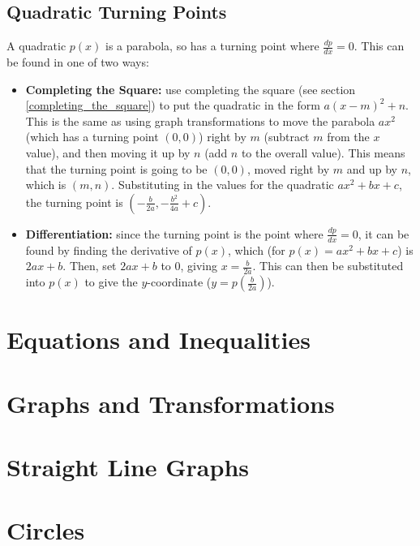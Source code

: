     \subsection{Quadratic Turning Points}
        A quadratic $p(x)$ is a parabola, so has a turning point where $\frac{dp}{dx}=0$.
        This can be found in one of two ways:
        \begin{itemize}
            \item \textbf{Completing the Square:} use completing the square (see section \ref{completing_the_square}) to put the quadratic in the form $a(x-m)^2+n$.
            This is the same as using graph transformations to move the parabola $ax^2$ (which has a turning point $(0,0)$) right by $m$ (subtract $m$ from the $x$ value), and then moving it up by $n$ (add $n$ to the overall value).
            This means that the turning point is going to be $(0,0)$, moved right by $m$ and up by $n$, which is $(m,n)$.
            Substituting in the values for the quadratic $ax^2+bx+c$, the turning point is $\left(-\frac{b}{2a},-\frac{b^2}{4a}+c\right)$.
            \item \textbf{Differentiation:} since the turning point is the point where $\frac{dp}{dx}=0$, it can be found by finding the derivative of $p(x)$, which (for $p(x)=ax^2+bx+c$) is $2ax+b$.
            Then, set $2ax+b$ to 0, giving $x=\frac{b}{2a}$.
            This can then be substituted into $p(x)$ to give the $y$-coordinate ($y=p\left(\frac{b}{2a}\right)$).
        \end{itemize}

    \newpage

\section{Equations and Inequalities} \label{equations_and_inequalities}
\newpage

\section{Graphs and Transformations} \label{graphs_and_transformations}
\newpage

\section{Straight Line Graphs} \label{straight_line_graphs}
\newpage

\section{Circles} \label{circles}
\newpage


